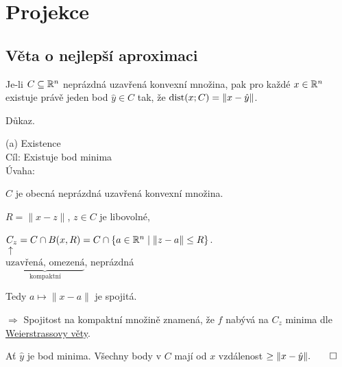 \section{Projekce}

\subsection{Věta o nejlepší aproximaci}
Je-li $C \subseteq \mathbb{R}^n$ neprázdná uzavřená konvexní množina, pak pro každé $x \in \mathbb{R}^n$ existuje právě jeden bod 
$\hat y \in C$ tak, že $\operatorname*{dist} (x; C) = \|x-\hat y\|$.

Důkaz.

(a) Existence\\
Cíl: Existuje bod minima\\
Úvaha:
\begin{multicols}{2}


    \begin{adjustwidth}{-2em}{0pt}
        $C$ je obecná neprázdná uzavřená konvexní množina.

        $R = \|x-z\|$, $z \in C$ je libovolné,

        $C_z = C \cap B (x, R) = C \cap \left\lbrace a \in \mathbb{R}^n \mid \|z-a\| \leq R \right\rbrace$.\\
        \hspace*{0.4em}$\uparrow$\\
        $\underbrace{\text{uzavřená, omezená}}_\text{kompaktní}$, neprázdná

        Tedy $a \mapsto \|x-a\|$ je spojitá.

        $\Rightarrow$ Spojitost na kompaktní množině znamená, že $f$ nabývá na $C_z$ minima dle 
        \href{https://cs.wikipedia.org/wiki/Weierstrassova_v%C4%9Bta}{Weierstrassovy věty}.
    \end{adjustwidth}
\end{multicols}
Ať $\hat y$ je bod minima. Všechny body v $C$ mají od $x$ vzdálenost $\geq \|x- \hat y\|. \qed$

